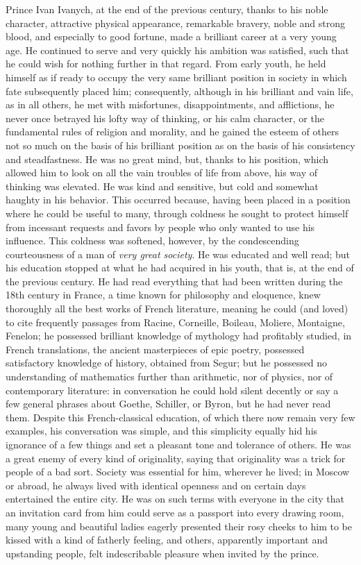 Prince Ivan Ivanych, at the end of the previous century, thanks to his noble character, attractive physical appearance, remarkable bravery, noble and strong blood, and especially to good fortune, made a brilliant career at a very young age. He continued to serve and very quickly his ambition was satisfied, such that he could wish for nothing further in that regard. From early youth, he held himself as if ready to occupy the very same brilliant position in society in which fate subsequently placed him; consequently, although in his brilliant and vain life, as in all others, he met with misfortunes, disappointments, and afflictions, he never once betrayed his lofty way of thinking, or his calm character, or the fundamental rules of religion and morality, and he gained the esteem of others not so much on the basis of his brilliant position as on the basis of his consistency and steadfastness. He was no great mind, but, thanks to his position, which allowed him to look on all the vain troubles of life from above, his way of thinking was elevated. He was kind and sensitive, but cold and somewhat haughty in his behavior. This occurred because, having been placed in a position where he could be useful to many, through coldness he sought to protect himself from incessant requests and favors by people who only wanted to use his influence. This coldness was softened, however, by the condescending courteousness of a man of \emph{very great society}. He was educated and well read; but his education stopped at what he had acquired in his youth, that is, at the end of the previous century. He had read everything that had been written during the 18th century in France, a time known for philosophy and eloquence, knew thoroughly all the best works of French literature, meaning he could (and loved) to cite frequently passages from Racine, Corneille, Boileau, Moliere, Montaigne, Fenelon; he possessed brilliant knowledge of mythology had profitably studied, in French translations, the ancient masterpieces of epic poetry, possessed satisfactory knowledge of history, obtained from Segur; but he possessed no understanding of mathematics further than arithmetic, nor of physics, nor of contemporary literature: in conversation he could hold silent decently or say a few general phrases about Goethe, Schiller, or Byron, but he had never read them. Despite this French-classical education, of which there now remain very few examples, his conversation was simple, and this simplicity equally hid his ignorance of a few things and set a pleasant tone and tolerance of others. He was a great enemy of every kind of originality, saying that originality was a trick for people of a bad sort. Society was essential for him, wherever he lived; in Moscow or abroad, he always lived with identical openness and on certain days entertained the entire city. He was on such terms with everyone in the city that an invitation card from him could serve as a passport into every drawing room, many young and beautiful ladies eagerly presented their rosy cheeks to him to be kissed with a kind of fatherly feeling, and others, apparently important and upstanding people, felt indescribable pleasure when invited by the prince.

